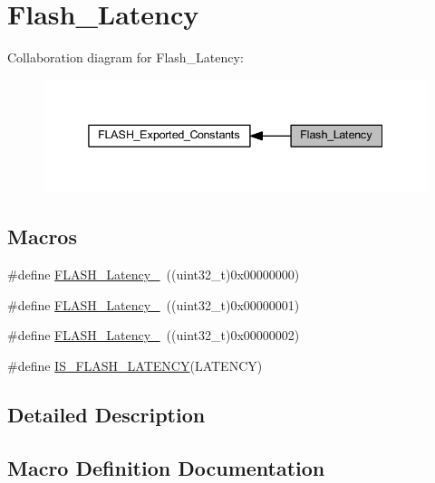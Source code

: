 \hypertarget{group___flash___latency}{}\section{Flash\+\_\+\+Latency}
\label{group___flash___latency}
Collaboration diagram for Flash\+\_\+\+Latency\+:
\nopagebreak
\begin{figure}[H]
\begin{center}
\leavevmode
\includegraphics[width=338pt]{group___flash___latency}
\end{center}
\end{figure}
\subsection*{Macros}
\begin{DoxyCompactItemize}
\item 
\#define \hyperlink{group___flash___latency_ga09afe6e52b819cc074f6111ec42ac3c3}{F\+L\+A\+S\+H\+\_\+\+Latency\+\_}~((uint32\+\_\+t)0x00000000)
\item 
\#define \hyperlink{group___flash___latency_ga6b7281665340fe8f7919bdfcfd06f8e6}{F\+L\+A\+S\+H\+\_\+\+Latency\+\_}~((uint32\+\_\+t)0x00000001)
\item 
\#define \hyperlink{group___flash___latency_ga55173ebb5c978459ce18d5e2516e3e89}{F\+L\+A\+S\+H\+\_\+\+Latency\+\_}~((uint32\+\_\+t)0x00000002)
\item 
\#define \hyperlink{group___flash___latency_gafcbd098d482318a622a58bf168547389}{I\+S\+\_\+\+F\+L\+A\+S\+H\+\_\+\+L\+A\+T\+E\+N\+CY}(L\+A\+T\+E\+N\+CY)
\end{DoxyCompactItemize}


\subsection{Detailed Description}


\subsection{Macro Definition Documentation}
\mbox{\label{group___flash___latency_ga09afe6e52b819cc074f6111ec42ac3c3}} 

